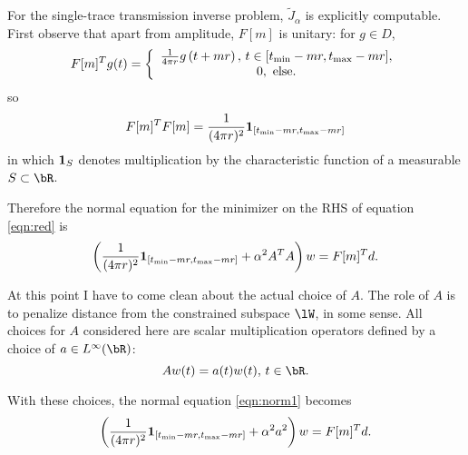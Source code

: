 For the single-trace transmission inverse problem, $\tilde{J}_{\alpha}$ is explicitly
computable. First observe that apart from amplitude, $F[m]$ is
unitary: for $g \in D$,
\begin{equation}
\label{eqn:tran}
F[m]^T g (t) =
\left\{
  \begin{array}{c}
    \frac{1}{4\pi r}g\left(t+mr\right), \, t \in [t_{\rm min}-mr,
    t_{\rm max}-mr],\\
    0, \mbox{ else.}
  \end{array}
\right.
\end{equation}
so
\begin{equation}
  \label{eqn:unit}
  F[m]^TF[m] = \frac{1}{(4\pi r)^2}{\bf 1}_{[t_{\rm min}-mr,  
    t_{\rm max}-mr]}
\end{equation}
in which ${\bf 1}_{S}$ denotes
multiplication by the characteristic function of a measurable 
$S \subset \bR$.

Therefore the normal equation for the minimizer on the RHS of equation \ref{eqn:red} is
\begin{equation}
  \label{eqn:norm1}
  \left(\frac{1}{(4\pi r)^2} {\bf 1}_{[t_{\rm min}-mr,  
      t_{\rm max}-mr]} + \alpha^2 A^TA\right)w= F[m]^Td.
\end{equation}

At this point I have to come clean about the actual choice of
$A$. The role of $A$ is to penalize distance from the constrained
subspace $\lW$, in some sense. All choices for $A$ considered here are scalar 
multiplication operators defined by a choice of $a \in L^{\infty}(\bR)$:
\begin{equation}
  \label{eqn:annmult}
  A w(t)= a(t)w(t), \, t\in \bR.
\end{equation}


With these choices, the normal equation \ref{eqn:norm1} becomes
\begin{equation}
\label{eqn:norm2}
\left(\frac{1}{(4\pi r)^2}  {\bf 1}_{[t_{\rm min}-mr,  
      t_{\rm max}-mr]} + \alpha^2a^2\right)w= F[m]^Td.
\end{equation}

